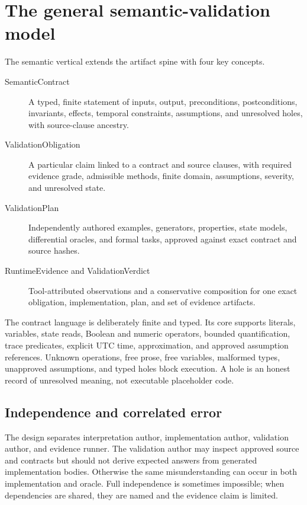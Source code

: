 \documentclass[11pt]{article}
\begin{document}
\section{The general semantic-validation model}

The semantic vertical extends the artifact spine with four key concepts.

\begin{description}
\item[SemanticContract] A typed, finite statement of inputs, output,
preconditions, postconditions, invariants, effects, temporal constraints,
assumptions, and unresolved holes, with source-clause ancestry.
\item[ValidationObligation] A particular claim linked to a contract and source
clauses, with required evidence grade, admissible methods, finite domain,
assumptions, severity, and unresolved state.
\item[ValidationPlan] Independently authored examples, generators,
properties, state models, differential oracles, and formal tasks, approved
against exact contract and source hashes.
\item[RuntimeEvidence and ValidationVerdict] Tool-attributed observations and
a conservative composition for one exact obligation, implementation, plan,
and set of evidence artifacts.
\end{description}

The contract language is deliberately finite and typed.  Its core supports
literals, variables, state reads, Boolean and numeric operators, bounded
quantification, trace predicates, explicit UTC time, approximation, and
approved assumption references.  Unknown operations, free prose, free
variables, malformed types, unapproved assumptions, and typed holes block
execution.  A hole is an honest record of unresolved meaning, not executable
placeholder code.

\subsection{Independence and correlated error}

The design separates interpretation author, implementation author, validation
author, and evidence runner.  The validation author may inspect approved
source and contracts but should not derive expected answers from generated
implementation bodies.  Otherwise the same misunderstanding can occur in
both implementation and oracle.  Full independence is sometimes impossible;
when dependencies are shared, they are named and the evidence claim is
limited.
\end{document}
